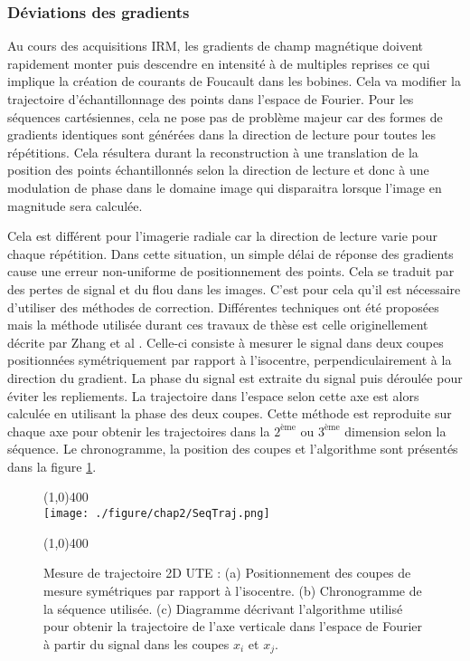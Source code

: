 \subsubsection{Déviations des gradients}

Au cours des acquisitions IRM, les gradients de champ magnétique doivent rapidement monter puis descendre en intensité à de multiples reprises ce qui implique la création de courants de Foucault dans les bobines. Cela va modifier la trajectoire d'échantillonnage des points dans l'espace de Fourier.
Pour les séquences cartésiennes, cela ne pose pas de problème majeur car des formes de gradients identiques sont générées dans la direction de lecture pour toutes les répétitions. Cela résultera durant la reconstruction à une translation de la position des points échantillonnés selon la direction de lecture et donc à une modulation de phase dans le domaine image qui disparaitra lorsque l'image en magnitude sera calculée.

Cela est différent pour l'imagerie radiale car la direction de lecture varie pour chaque répétition. Dans cette situation, un simple délai de réponse des gradients cause une erreur non-uniforme de positionnement des points. Cela se traduit par des pertes de signal et du flou dans les images. C'est pour cela qu'il est nécessaire d'utiliser des méthodes de correction. Différentes techniques ont été proposées \cite{Alley:1998vn,Addy:2012kx} mais la méthode utilisée durant ces travaux de thèse est celle originellement décrite par Zhang et al \cite{Zhang:1998uq}.
Celle-ci consiste à mesurer le signal dans deux coupes positionnées symétriquement par rapport à l'isocentre, perpendiculairement à la direction du gradient. La phase du signal est extraite du signal puis déroulée pour éviter les repliements. La trajectoire dans l'espace selon cette axe est alors calculée en utilisant la phase des deux coupes. Cette méthode est reproduite sur chaque axe pour obtenir les trajectoires dans la $2^\text{ème}$ ou $3^\text{ème}$ dimension selon la séquence. Le chronogramme, la position des coupes et l'algorithme sont présentés dans la figure \ref{fig:SeqTraj}.

\begin{figure}[H]
\centering
\line(1,0){400} \\
\texttt{[image: ./figure/chap2/SeqTraj.png]}
\caption[Méthode mesure trajectoire]{\label{fig:SeqTraj}  
Mesure de trajectoire 2D UTE : (a) Positionnement des coupes de mesure symétriques par rapport à l'isocentre. (b) Chronogramme de la séquence utilisée. (c) Diagramme décrivant l'algorithme utilisé pour obtenir la trajectoire de l'axe verticale dans l'espace de Fourier à partir du signal dans les coupes $x_i$ et $x_j$.}
\line(1,0){400} \\
\end{figure}

